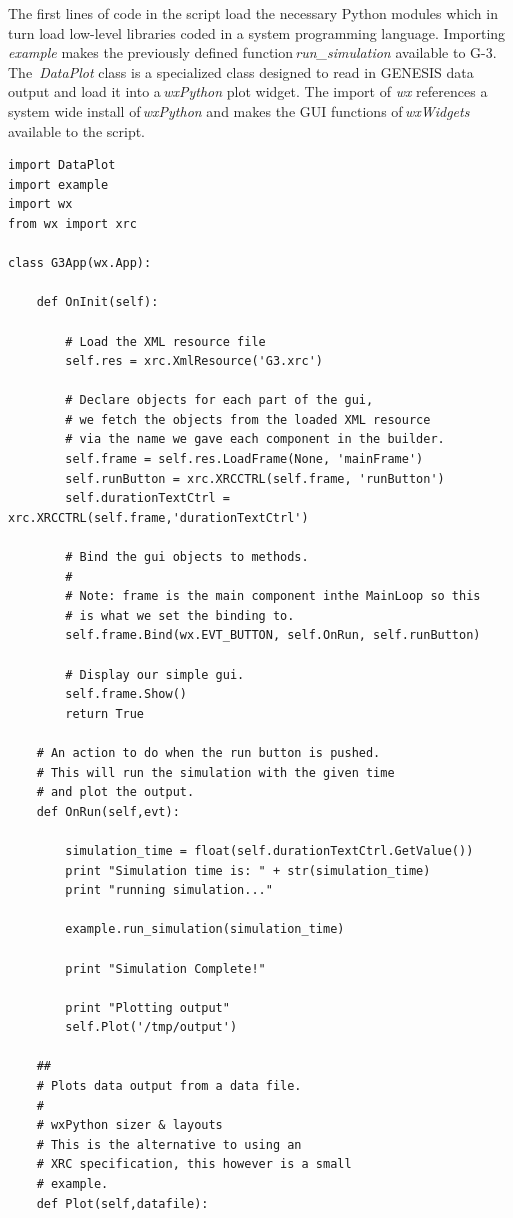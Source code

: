 \documentclass[10pt]{article}
\begin{document}
The first lines of code in the script load the necessary Python
modules which in turn load low-level libraries coded in a system
programming language.  Importing\,{\it example} makes the
previously defined function\,{\it run\_simulation} available to G-3.  The\,{\it
  DataPlot} class is a specialized class designed to read in GENESIS data
output and load it into a\,{\it wxPython} plot widget.  The import of
{\it wx} references a system wide install of\,{\it wxPython} and makes
the GUI functions of\,{\it wxWidgets} available to the script.

\begin{verbatim}
import DataPlot
import example
import wx
from wx import xrc

class G3App(wx.App):

    def OnInit(self):

        # Load the XML resource file
        self.res = xrc.XmlResource('G3.xrc')

        # Declare objects for each part of the gui,
        # we fetch the objects from the loaded XML resource
        # via the name we gave each component in the builder.
        self.frame = self.res.LoadFrame(None, 'mainFrame')
        self.runButton = xrc.XRCCTRL(self.frame, 'runButton')
        self.durationTextCtrl = xrc.XRCCTRL(self.frame,'durationTextCtrl')

        # Bind the gui objects to methods.
        #
        # Note: frame is the main component inthe MainLoop so this
        # is what we set the binding to. 
        self.frame.Bind(wx.EVT_BUTTON, self.OnRun, self.runButton)

        # Display our simple gui.
        self.frame.Show()
        return True       

    # An action to do when the run button is pushed.
    # This will run the simulation with the given time
    # and plot the output.
    def OnRun(self,evt):

        simulation_time = float(self.durationTextCtrl.GetValue())
        print "Simulation time is: " + str(simulation_time)
        print "running simulation..."

        example.run_simulation(simulation_time)

        print "Simulation Complete!"

        print "Plotting output"
        self.Plot('/tmp/output')

    ##
    # Plots data output from a data file.
    #
    # wxPython sizer & layouts
    # This is the alternative to using an
    # XRC specification, this however is a small
    # example.
    def Plot(self,datafile):


\end{verbatim}
\end{document}
